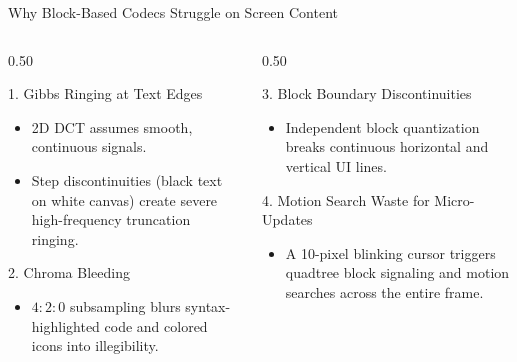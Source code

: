 \documentclass[aspectratio=169, 10pt]{beamer}
\begin{document}
\begin{frame}{Why Block-Based Codecs Struggle on Screen Content}
    \begin{columns}
        \begin{column}{0.50\textwidth}
            \begin{block}{1. Gibbs Ringing at Text Edges}
                \begin{itemize}
                    \item 2D DCT assumes smooth, continuous signals.
                    \item Step discontinuities (black text on white canvas) create severe high-frequency truncation ringing.
                \end{itemize}
            \end{block}
            \begin{block}{2. Chroma Bleeding}
                \begin{itemize}
                    \item $4:2:0$ subsampling blurs syntax-highlighted code and colored icons into illegibility.
                \end{itemize}
            \end{block}
        \end{column}
        \begin{column}{0.50\textwidth}
            \begin{block}{3. Block Boundary Discontinuities}
                \begin{itemize}
                    \item Independent block quantization breaks continuous horizontal and vertical UI lines.
                \end{itemize}
            \end{block}
            \begin{block}{4. Motion Search Waste for Micro-Updates}
                \begin{itemize}
                    \item A 10-pixel blinking cursor triggers quadtree block signaling and motion searches across the entire frame.
                \end{itemize}
            \end{block}
        \end{column}
    \end{columns}
\end{frame}
\end{document}
